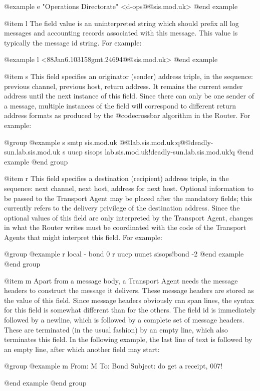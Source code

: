 {{@example
e "Operations Directorate" <d-ops@@sis.mod.uk>
@end example

@item l
The field value is an uninterpreted string which should prefix all log
messages and accounting records associated with this message.  This value
is typically the message id string.  For example:

@example
l <88Jan6.103158gmt.24694@@sis.mod.uk>
@end example

@item s
This field specifies an originator (sender) address triple, in the sequence:
previous channel, previous host, return address.
It remains the current sender address until the next instance of this field.
Since there can only be one sender of a message, multiple instances of
the field will correspond to different return address formats as produced
by the @code{crossbar} algorithm in the Router.
For example:

@group
@example
s smtp sis.mod.uk @@lab.sis.mod.uk:q@@deadly-sun.lab.sis.mod.uk
s uucp sisops lab.sis.mod.uk!deadly-sun.lab.sis.mod.uk!q
@end example
@end group

@item r
This field specifies a destination (recipient) address triple, in the
sequence: next channel, next host, address for next host.  Optional
information to be passed to the Transport Agent may be placed after the
mandatory fields; this currently refers to the delivery privilege of the
destination address.
Since the optional values of this field are only interpreted by
the Transport Agent, changes in what the Router writes must be
coordinated with the code of the Transport Agents that might interpret
this field.
For example:

@group
@example
r local - bond 0
r uucp uunet sisops!bond -2
@end example
@end group

@item m
Apart from a message body, a Transport Agent needs the message headers
to construct the message it delivers.
These message headers are stored as the value of this field.
Since message headers obviously can span lines, the syntax for
this field is somewhat different than for the others.
The field id is immediately followed by a newline, which is followed
by a complete set of message headers.
These are terminated (in the usual fashion) by an empty line, which
also terminates this field.
In the following example, the last line of text is followed by an empty
line, after which another field may start:

@group
@example
m
From: M
To: Bond
Subject: do get a receipt, 007!

@end example
@end group

}}
